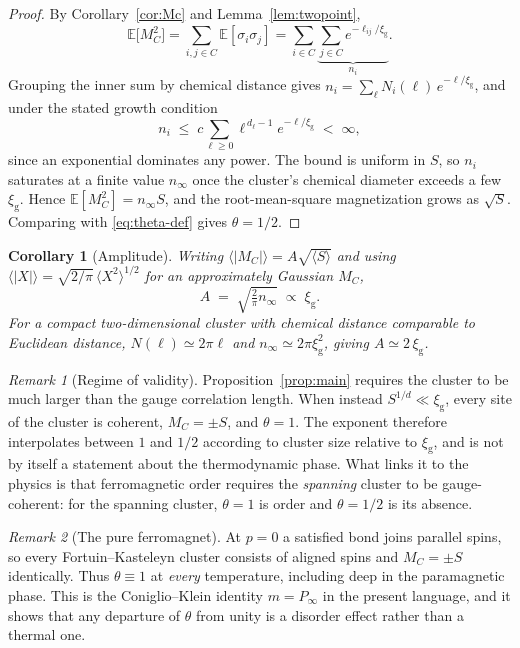\documentclass[11pt]{article}
\newtheorem{corollary}{Corollary}
\theoremstyle{remark}
\newtheorem{remark}{Remark}
\newcommand{\Mc}{M_{C}}
\newcommand{\xig}{\xi_{\mathrm{g}}}
\begin{document}
\begin{proof}
By Corollary~\ref{cor:Mc} and Lemma~\ref{lem:twopoint},
\begin{equation}
  \mathbb{E}\bigl[\Mc^{2}\bigr]
  = \sum_{i,j \in C} \mathbb{E}[\sigma_i \sigma_j]
  = \sum_{i \in C} \underbrace{\sum_{j \in C} e^{-\ell_{ij}/\xig}}_{\textstyle n_i}.
\end{equation}
Grouping the inner sum by chemical distance gives
$n_i = \sum_{\ell} N_i(\ell)\,e^{-\ell/\xig}$, and under the stated growth condition
\begin{equation}
  n_i \;\le\; c \sum_{\ell \ge 0} \ell^{\,d_\ell-1} e^{-\ell/\xig} \;<\; \infty,
\end{equation}
since an exponential dominates any power. The bound is uniform in $S$, so $n_i$ saturates
at a finite value $n_\infty$ once the cluster's chemical diameter exceeds a few $\xig$.
Hence $\mathbb{E}[\Mc^{2}] = n_\infty S$, and the root-mean-square magnetization grows as
$\sqrt{S}$. Comparing with \eqref{eq:theta-def} gives $\theta = 1/2$.
\end{proof}

\begin{corollary}[Amplitude]\label{cor:amp}
Writing $\langle |\Mc| \rangle = A\sqrt{\langle S\rangle}$ and using
$\langle |X| \rangle = \sqrt{2/\pi}\,\langle X^{2}\rangle^{1/2}$ for an approximately
Gaussian $\Mc$,
\begin{equation}
  A \;=\; \sqrt{\tfrac{2}{\pi} n_\infty} \;\propto\; \xig .
\end{equation}
For a compact two-dimensional cluster with chemical distance comparable to Euclidean
distance, $N(\ell)\simeq 2\pi\ell$ and $n_\infty \simeq 2\pi\xig^{2}$, giving
$A \simeq 2\,\xig$.
\end{corollary}

\begin{remark}[Regime of validity]
Proposition~\ref{prop:main} requires the cluster to be much larger than the gauge
correlation length. When instead $S^{1/d} \ll \xig$, every site of the cluster is
coherent, $\Mc = \pm S$, and $\theta = 1$. The exponent therefore interpolates between $1$
and $1/2$ according to cluster size relative to $\xig$, and is not by itself a statement
about the thermodynamic phase. What links it to the physics is that ferromagnetic order
requires the \emph{spanning} cluster to be gauge-coherent: for the spanning cluster,
$\theta = 1$ is order and $\theta = 1/2$ is its absence.
\end{remark}

\begin{remark}[The pure ferromagnet]
At $p = 0$ a satisfied bond joins parallel spins, so every Fortuin--Kasteleyn cluster
consists of aligned spins and $\Mc = \pm S$ identically. Thus $\theta \equiv 1$ at
\emph{every} temperature, including deep in the paramagnetic phase. This is the
Coniglio--Klein identity $m = P_\infty$ in the present language, and it shows that any
departure of $\theta$ from unity is a disorder effect rather than a thermal one.
\end{remark}
\end{document}
